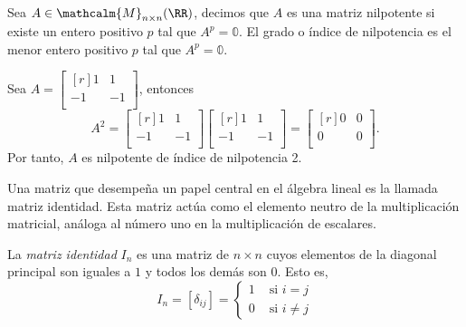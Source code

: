 \begin{definicion}{}{}
    Sea $A \in \mathcalm{M}_{n \times n}(\RR)$, decimos que $A$ es una matriz nilpotente si existe un entero positivo $p$ tal que $A^p = \mathbb{0}$. El grado o índice de nilpotencia es el menor entero positivo $p$ tal que $A^p = \mathbb{0}$.
\end{definicion}

\begin{examplebox}{}{}
    Sea $A = \begin{bmatrix*}[r]
        1 & 1 \\
        -1 & -1 \\
    \end{bmatrix*}$, entonces
    $$A^2 = \begin{bmatrix*}[r]
        1 & 1 \\
        -1 & -1 \\
    \end{bmatrix*} \begin{bmatrix*}[r]
        1 & 1 \\
        -1 & -1 \\
    \end{bmatrix*} = \begin{bmatrix*}[r]
        0 & 0 \\
        0 & 0 \\
    \end{bmatrix*}.$$
    Por tanto, $A$ es nilpotente de índice de nilpotencia 2.
\end{examplebox}

Una matriz que desempeña un papel central en el álgebra lineal es la llamada matriz identidad. Esta matriz actúa como el elemento neutro de la multiplicación matricial, análoga al número uno en la multiplicación de escalares.

\begin{definicion}{}{}
    La \emph{matriz identidad} $I_n$ es una matriz de $n \times n$ cuyos elementos de la diagonal principal son iguales a $1$ y todos los demás son $0$. Esto es,
    $$I_n = [ \delta_{ij} ] = \begin{cases}
        1 & \text{ si } i = j \\
        0 & \text{ si } i \neq j
    \end{cases}$$
\end{definicion}

